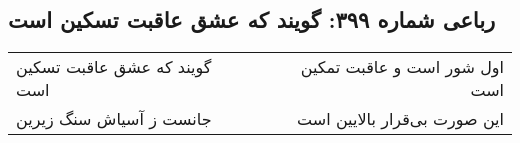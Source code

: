 \begin{center}
\section*{رباعی شماره ۳۹۹: گویند که عشق عاقبت تسکین است}
\label{sec:0399}
\begin{longtable}{l p{0.5cm} r}
گویند که عشق عاقبت تسکین است
&&
اول شور است و عاقبت تمکین است
\\
جانست ز آسیاش سنگ زیرین
&&
این صورت بی‌قرار بالایین است
\\
\end{longtable}
\end{center}
